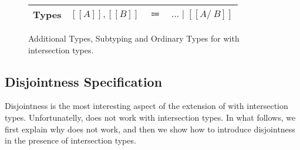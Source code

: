 \begin{figure}[t]
    \centering
    \begin{tabular}{lrcl} \toprule
      Types & $[[A]], [[B]]$ & $\Coloneqq$ & $ ... \mid [[A /\ B]] $ \\
      \bottomrule
    \end{tabular}
    \centering
    \centering
  \caption{Additional Types, Subtyping and Ordinary Types for \cal with intersection types.}
  \label{fig:inter:system}
\end{figure}

\subsection{Disjointness Specification}
\label{sec:inter:disj}
Disjointness is the most interesting aspect of the extension of \cal with
intersection types. Unfortunatelly,  does not work with intersection
types. In what follows, we first explain why  does not work, and then
we show how to introduce disjointness in the presence of intersection types. 


